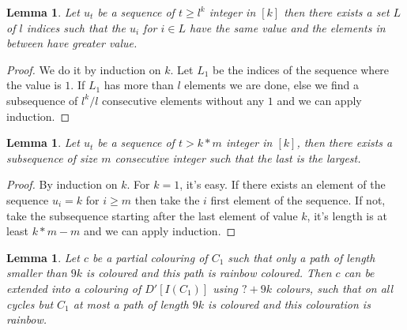 \documentclass[utf8,10pt]{article}
\theoremstyle{plain}
\newtheorem{lemma}[theorem]{Lemma}
\theoremstyle{definition}
\theoremstyle{remark}
\begin{document}
\begin{lemma}\label{min}
Let $u_t$ be a sequence of $t \geq l^k$ integer in $[k]$ then there exists a set $L$ of $l$ indices such that the $u_i$ for $i \in L$ have the same value
and the elements in between have greater value.
\end{lemma}

\begin{proof}
We do it by induction on $k$. Let $L_1$ be the indices of the sequence where the value is $1$. If $L_1$ has more than $l$ elements we are done,
else we find a subsequence of $l^k/l$ consecutive elements without any $1$ and we can apply induction.
\end{proof}

\begin{lemma}\label{max}
Let $u_t$ be a sequence of $t > k*m$ integer in $[k]$, then there exists a subsequence of size $m$ consecutive integer such that the
last is the largest.
\end{lemma}

\begin{proof}
By induction on $k$. For $k = 1$, it's easy.
If there exists an element of the sequence $u_i = k$ for $i \geq m$ then take the $i$ first element of the sequence.
If not, take the subsequence starting after the last element of value $k$, it's length is at least $k*m - m$ and we can apply induction.
\end{proof}

\begin{lemma}\label{IC}
Let $c$ be a partial colouring of $C_1$ such that only a path of length smaller than
$9k$ is coloured and this path is rainbow coloured. Then $c$ can be extended into
a colouring of $D'[I(C_1)]$ using $? + 9k$ colours, such that on all cycles but $C_1$ at most a path of length $9k$ is
coloured and this colouration is rainbow.
\end{lemma}
\end{document}
